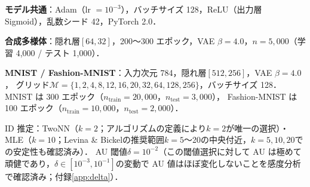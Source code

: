 \documentclass[11pt,a4paper]{jsarticle}
\begin{document}
\textbf{モデル共通}：Adam（lr $= 10^{-3}$），バッチサイズ 128，ReLU（出力層 Sigmoid），乱数シード 42，PyTorch 2.0．

\textbf{合成多様体}：隠れ層$[64, 32]$，200〜300 エポック，VAE $\beta = 4.0$，$n = 5{,}000$（学習 4,000 / テスト 1,000）．

\textbf{MNIST / Fashion-MNIST}：入力次元 784，隠れ層$[512, 256]$，VAE $\beta = 4.0$，
グリッド$\mathcal{M} = \{1,2,4,8,12,16,20,32,64,128,256\}$，バッチサイズ 128．
MNIST は 300 エポック（$n_{\mathrm{train}} = 20{,}000$，$n_{\mathrm{test}} = 3{,}000$），
Fashion-MNIST は 100 エポック（$n_{\mathrm{train}} = 10{,}000$，$n_{\mathrm{test}} = 2{,}000$）．

ID 推定：TwoNN（$k=2$；アルゴリズムの定義により$k=2$が唯一の選択）・MLE（$k=10$；Levina \& Bickel\cite{levina2005mle}の推奨範囲$k=5$〜20の中央付近，$k=5,10,20$での安定性も確認済み）\cite{facco2017twonn,levina2005mle}．
AU 閾値$\delta = 10^{-2}$\cite{lucas2019elbo}（この閾値選択に対して AU は極めて頑健であり，$\delta \in [10^{-3}, 10^{-1}]$の変動で AU 値はほぼ変化しないことを感度分析で確認済み；付録\ref{app:delta}）．
\end{document}
